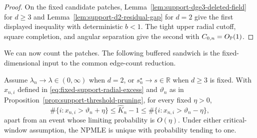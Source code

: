 \begin{proof}
On the fixed candidate patches,
Lemma~\ref{lem:support-dge3-deleted-field} for \(d\ge3\) and
Lemma~\ref{lem:support-d2-residual-gap} for \(d=2\) give the first displayed
inequality with deterministic \(b<1\). The tight upper radial cutoff,
square completion, and angular separation give the second with
\(C_{0,n}=O_{\mathbb P}(1)\).
\end{proof}

We can now count the patches. The following buffered sandwich is the
fixed-dimensional input to the common edge-count reduction.
\begin{proposition}
\label{prop:fixed-dimensional-edge-sandwich}
Assume \(\lambda_n\to\lambda\in(0,\infty)\) when \(d=2\), or
\(s_n^\star\to s\in\mathbb R\) when \(d\ge3\) is fixed. With
\(x_{n,i}\) defined in \eqref{eq:fixed-support-radial-excess} and
\(\vartheta_n\) as in Proposition~\ref{prop:support-threshold-pruning}, for
every fixed \(\eta>0\),
\begin{equation}
\label{eq:support-count-sandwich}
 \#\{i:x_{n,i}>\vartheta_n+\eta\}
 \le\widehat K_n-1
 \le\#\{i:x_{n,i}>\vartheta_n-\eta\},
\end{equation}
apart from an event whose limiting probability is \(O(\eta)\).
Under either critical-window assumption, the NPMLE is unique with probability
tending to one.
\end{proposition}

